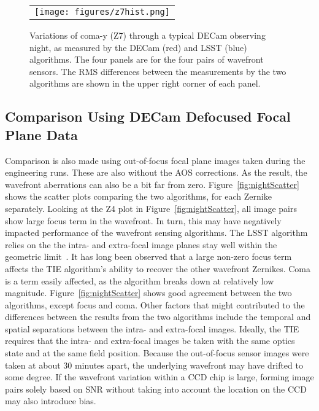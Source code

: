 \documentclass[]{spie}  %
\begin{document}
   \begin{figure} [tbph]
   \begin{center}
   \begin{tabular}{c} %
   \texttt{[image: figures/z7hist.png]}
   \end{tabular}
   \end{center}
   \caption[example] 
   { \label{fig:z7hist} 
Variations of coma-y (Z7) through a typical DECam observing night, as measured by the DECam (red) and LSST (blue) algorithms. The four panels are for the four pairs of wavefront sensors.
The RMS differences between the measurements by the two algorithms are shown in the upper right corner of each panel. 
}
   \end{figure} 


\subsection{Comparison Using DECam Defocused Focal Plane Data}

Comparison is also made using out-of-focus focal plane images taken during the engineering runs.
These are also without the AOS corrections. As the result, the wavefront aberrations can also be a bit far from zero. Figure~\ref{fig:nightScatter} shows the scatter plots comparing the two algorithms, for each Zernike separately. Looking at the Z4 plot in Figure~\ref{fig:nightScatter}, all image pairs show large focus term in the wavefront. In turn, this may have negatively impacted performance of the wavefront sensing algorithms.
The LSST algorithm relies on the the intra- and extra-focal image planes stay well within the geometric limit~\cite{lsstcwfs}.
It has long been observed that a large non-zero focus term affects the TIE algorithm's ability to recover the other wavefront Zernikes.
Coma is a term easily affected, as the algorithm breaks down at relatively low magnitude.
Figure~\ref{fig:nightScatter} shows good agreement between the two algorithms, except focus and coma.
Other factors that might contributed to the differences between the results from the two algorithms include the temporal and spatial separations between the intra- and extra-focal images.
Ideally, the TIE requires that the intra- and extra-focal images be taken with the same optics state and at the same field position.
Because the out-of-focus sensor images were taken at about 30 minutes apart, the underlying wavefront may have drifted to some degree.
If the wavefront variation within a CCD chip is large, forming image pairs solely based on SNR without taking into account the location on the CCD may also introduce bias.
\end{document}
